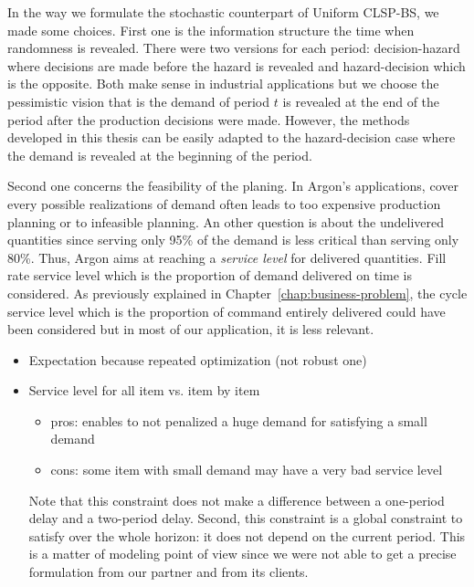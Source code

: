 In the way we formulate the stochastic counterpart of Uniform CLSP-BS, we made some choices. First one is the information structure \ie the time when randomness is revealed. There were two versions for each period: decision-hazard where decisions are made before the hazard is revealed and hazard-decision which is the opposite. Both make sense in industrial applications but we choose the pessimistic vision that is the demand of period $t$ is revealed at the end of the period after the production decisions were made. However, the methods developed in this thesis can be easily adapted to the hazard-decision case where the demand is revealed at the beginning of the period.


Second one concerns the feasibility of the planing. In Argon's applications, cover every possible realizations of demand often leads to too expensive production planning or to infeasible planning. An other question is about the undelivered quantities since serving only 95\% of the demand is less critical than serving only 80\%. Thus, Argon aims at reaching a \emph{service level} for delivered quantities. Fill rate service level which is the proportion of demand delivered on time is considered. As previously explained in Chapter~\ref{chap:business-problem}, the cycle service level which is the proportion of command entirely delivered could have been considered but in most of our application, it is less relevant.


\begin{itemize}
  \item Expectation because repeated optimization (not robust one)
  \item Service level for all item vs. item by item
  \begin{itemize}
    \item pros: enables to not penalized a huge demand for satisfying a small demand
    \item cons: some item with small demand may have a very bad service level
  \end{itemize}
  Note that this constraint does not make a difference between a one-period delay and a two-period delay. Second, this constraint is a global constraint to satisfy over the whole horizon: it does not depend on the current period. This is a matter of modeling point of view since we were not able to get a precise formulation from our partner and from its clients.
\end{itemize}